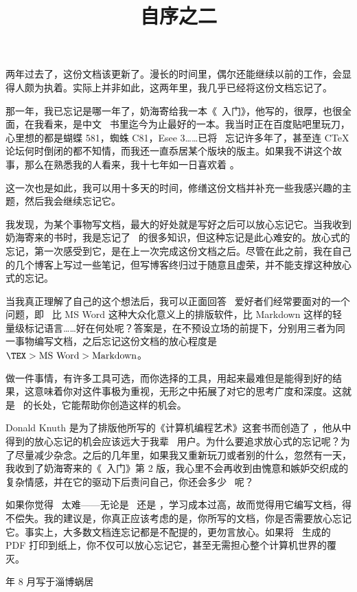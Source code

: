 \title{自序之二}

两年过去了，这份文档该更新了。漫长的时间里，偶尔还能继续以前的工作，会显得人颇为执着。实际上并非如此，这两年里，我几乎已经将这份文档忘记了。

那一年，我已忘记是哪一年了，奶海寄给我一本《\LATEX\ 入门》，他写的，很厚，也很全面，在我看来，是中文 \LATEX\ 书里迄今为止最好的一本。我当时正在百度贴吧里玩刀，心里想的都是蝴蝶 581，蜘蛛 C81，Esee 3……已将 \TEX\ 忘记许多年了，甚至连 CTeX 论坛何时倒闭的都不知情，而我还一直忝居某个版块的版主。如果我不讲这个故事，那么在熟悉我的人看来，我十七年如一日喜欢着 \CONTEXT。

这一次也是如此，我可以用十多天的时间，修缮这份文档并补充一些我感兴趣的主题，然后我会继续忘记它。

我发现，为某个事物写文档，最大的好处就是写好之后可以放心忘记它。当我收到奶海寄来的书时，我是忘记了 \CONTEXT\ 的很多知识，但这种忘记是此心难安的。放心式的忘记，第一次感受到它，是在上一次完成这份文档之后。尽管在此之前，我在自己的几个博客上写过一些笔记，但写博客终归过于随意且虚荣，并不能支撑这种放心式的忘记。

当我真正理解了自己的这个想法后，我可以正面回答 \TEX\ 爱好者们经常要面对的一个问题，即 \TEX\ 比 MS Word 这种大众化意义上的排版软件，比 Markdown 这样的轻量级标记语言……好在何处呢？答案是，在不预设立场的前提下，分别用三者为同一事物编写文档，之后忘记这份文档的放心程度是 $\text{\TEX} > \text{MS Word} > \text{Markdown}$。

做一件事情，有许多工具可选，而你选择的工具，用起来最难但是能得到好的结果，这意味着你对这件事极为重视，无形之中拓展了对它的思考广度和深度。这就是 \TEX\ 的长处，它能帮助你创造这样的机会。

Donald Knuth 是为了排版他所写的《计算机编程艺术》这套书而创造了 \TEX，他从中得到的放心忘记的机会应该远大于我辈 \TEX\ 用户。为什么要追求放心式的忘记呢？为了尽量减少杂念。之后的几年里，如果我又重新玩刀或者别的什么，忽然有一天，我收到了奶海寄来的《\LATEX\ 入门》第 2 版，我心里不会再收到由愧意和嫉妒交织成的复杂情感，并在它的驱动下后责问自己，你还会多少 \CONTEXT\ 呢？

如果你觉得 \TEX\ 太难——无论是 \LATEX\ 还是 \CONTEXT，学习成本过高，故而觉得用它编写文档，得不偿失。我的建议是，你真正应该考虑的是，你所写的文档，你是否需要放心忘记它。事实上，大多数文档连忘记都是不配提的，更勿言放心。如果将 \TEX\ 生成的 PDF 打印到纸上，你不仅可以放心忘记它，甚至无需担心整个计算机世界的覆灭。

\vfill
{} 年 8 月写于淄博蜗居
\stopalignment
